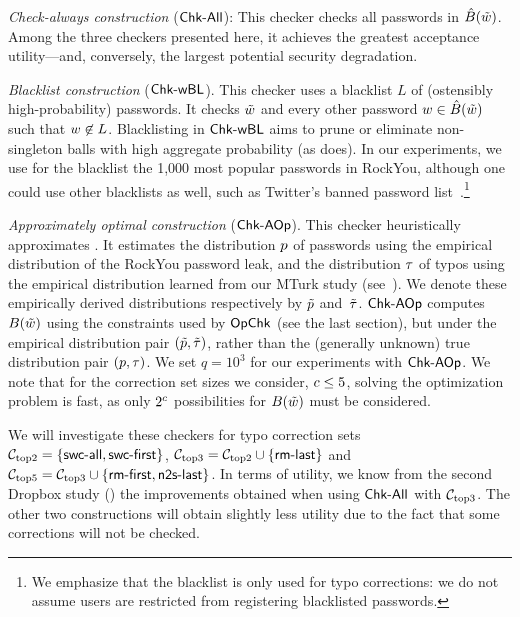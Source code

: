 \begin{newitemize}
\item \emph{Check-always construction} ($\textnormal{\textsf{Chk-All}}$): This checker checks all passwords in
  $\hat{B}(\tilde{w})$. Among the three checkers presented here, it achieves the greatest acceptance utility---and,
  conversely, the largest potential security degradation.
  
\item \emph{Blacklist construction} ($\textnormal{\textsf{Chk-wBL}}$). This checker uses a blacklist $L$ of
  (ostensibly high-probability) passwords. It checks $\tilde{w}$ and
  every other password ${w} \in \hat{B}(\tilde{w})$ such that
  ${w} \not\in L$. Blacklisting in $\textnormal{\textsf{Chk-wBL}}$ aims to prune or
  eliminate non-singleton balls with high aggregate probability (as
  \opchecker does).  In our experiments, we use for the blacklist the 1,000 most popular
  passwords in RockYou, although one could use other blacklists as
  well, such as Twitter's banned password list~\cite{twitterbanned}.\footnote{We
  emphasize that the blacklist is only used for typo corrections: we do not
  assume users are restricted from registering blacklisted passwords.}

\item \emph{Approximately optimal construction} ($\textnormal{\textsf{Chk-AOp}}$). 
  This checker heuristically approximates
  \opchecker. It estimates the distribution $p$ of passwords
  using the empirical distribution of the RockYou password leak, and
  the distribution $\tau$ of typos using the empirical
  distribution learned from our MTurk study
  (see~). We denote these empirically derived
  distributions respectively by $\tilde{p}$ and~$\tilde{\tau}$. $\textnormal{\textsf{Chk-AOp}}$ 
  computes $B(\tilde{w})$ using the
  constraints used by $\textnormal{\textsf{OpChk}}$ (see the last section), but under the empirical
  distribution pair $(\tilde{p},\tilde{\tau})$, rather than the
  (generally unknown) true distribution pair $(p,\tau)$.
  We set $q=10^3$ for our experiments with $\textnormal{\textsf{Chk-AOp}}$. We note that for
  the correction set sizes we consider, $c \le 5$,  
  solving the optimization problem is fast, as only $2^c$ possibilities for $B(\tilde{w})$ must be considered.
\end{newitemize}
We will investigate these checkers for typo correction sets ${\mathcal C}_{\textrm{top2}} =
\{\textsf{swc-all},\textsf{swc-first}\}$, ${\mathcal C}_{\textrm{top3}} = {\mathcal C}_{\textrm{top2}} \cup \{\textsf{rm-last}\}$ and ${\mathcal C}_{\textrm{top5}} =
{\mathcal C}_{\textrm{top3}} \cup \{\textsf{rm-first},\textsf{n2s-last}\}$. In terms of utility, we know from the
second Dropbox study () the improvements obtained when using 
$\textnormal{\textsf{Chk-All}}$ with ${\mathcal C}_{\textrm{top3}}$. The other two constructions will obtain slightly less utility due
to the fact that some corrections will not be checked. 

